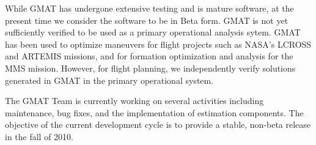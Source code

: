 While GMAT has undergone extensive testing and is mature software, at the present time we consider
the software to be in Beta form.  GMAT is not yet sufficiently verified to be
used as a primary operational analysis sytem. GMAT has been used to optimize maneuvers for flight projects such as NASA's LCROSS and ARTEMIS missions, and for formation optimization and analysis for the
MMS mission.  However, for flight planning, we independently verify solutions
generated in GMAT in the primary operational system.

The GMAT Team is currently working on several activities including maintenance,
bug fixes, and the implementation of estimation components.   The objective of
the current development cycle is to provide a stable, non-beta release in the fall of
2010.






